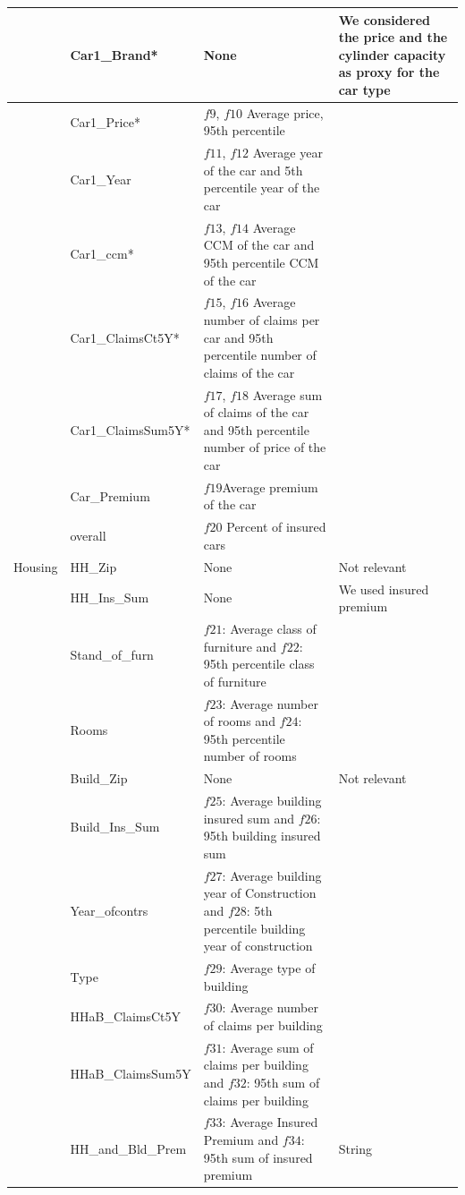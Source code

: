 \documentclass[12pt]{article}
\begin{document}
\begin{table}[h]
\begin{tabular}{l|l|p{6.5cm}|p{3.5cm}}
&Car1\_Brand*       & None                                         & We considered the price and the cylinder capacity as proxy for the car type                           \\ \hline
&Car1\_Price*       & $f9$, $f10$  Average price, 95th percentile                                  &                           \\ \hline
&Car1\_Year         & $f11$, $f12$ Average year of the car  and 5th percentile year of the car                   &         \\ \hline
&Car1\_ccm*         & $f13$, $f14$ Average CCM of the car and 95th percentile CCM of the car       &                           \\ \hline
&Car1\_ClaimsCt5Y*  & $f15$, $f16$ Average number of claims per car  and 95th percentile number of claims of the car   &  \\ \hline
&Car1\_ClaimsSum5Y* & $f17$, $f18$ Average sum of claims of the car and 95th percentile number of price of the car &                             \\ \hline
&Car\_Premium       & $f19 $Average premium of the car            &                            \\					     \hline                             								    
&overall & $f20$ Percent of insured cars   								   &                            \\					     \hline  \hline
Housing&HH\_Zip            & None                               & Not relevant                     \\ \hline
&HH\_Ins\_Sum       & None           & We used insured premium                          \\ \hline
&Stand\_of\_furn    & $f21$: Average class of furniture and $f22$: 95th percentile class of furniture    &  \\ \hline
&Rooms              & $f23$: Average number of rooms and $f24$: 95th percentile number of rooms       &                        \\ \hline
&Build\_Zip         & None                            & Not relevant                     \\ \hline
&Build\_Ins\_Sum    & $f25$: Average building insured sum and $f26$: 95th building insured sum        &                           \\ \hline
&Year\_ofcontrs     & $f27$: Average building year of Construction and $f28$: 5th percentile building year of construction              \\ \hline
&Type               & $f29$: Average type of building                                    &                        \\ \hline
&HHaB\_ClaimsCt5Y   & $f30$: Average number of claims per building    &    \\ \hline
&HHaB\_ClaimsSum5Y  & $f31$: Average sum of claims per building and $f32$: 95th sum of claims per building  &                           \\ \hline
&HH\_and\_Bld\_Prem & $f33$: Average Insured Premium and $f34$: 95th sum of insured premium                              & String        
\end{tabular}
\end{table}
\end{document}
